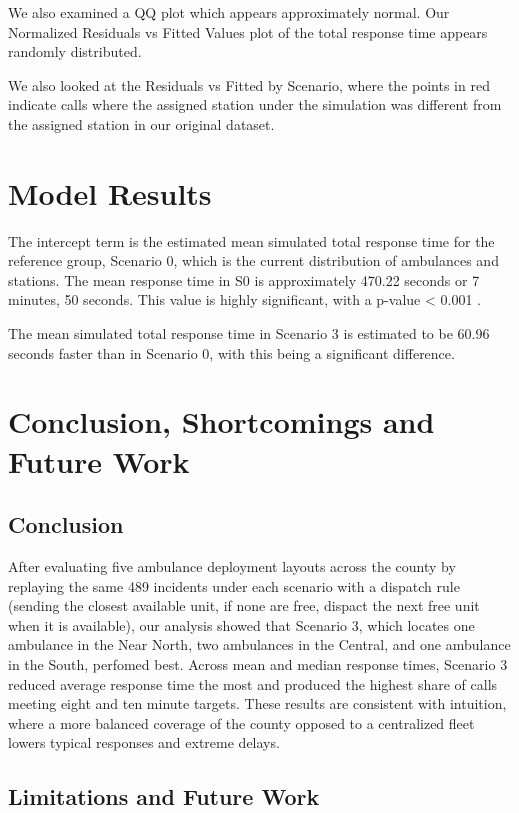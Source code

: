 \documentclass[
  11pt,
]{article}
\begin{document}
We also examined a QQ plot which appears approximately normal. Our
Normalized Residuals vs Fitted Values plot of the total response time
appears randomly distributed.

We also looked at the Residuals vs Fitted by Scenario, where the points
in red indicate calls where the assigned station under the simulation
was different from the assigned station in our original dataset.

\section{Model Results}\label{model-results}

The intercept term is the estimated mean simulated total response time
for the reference group, Scenario 0, which is the current distribution
of ambulances and stations. The mean response time in S0 is
approximately 470.22 seconds or 7 minutes, 50 seconds. This value is
highly significant, with a p-value \textless{} 0.001 .

The mean simulated total response time in Scenario 3 is estimated to be
60.96 seconds faster than in Scenario 0, with this being a significant
difference.

\section{Conclusion, Shortcomings and Future
Work}\label{conclusion-shortcomings-and-future-work}

\subsection{Conclusion}\label{conclusion}

After evaluating five ambulance deployment layouts across the county by
replaying the same 489 incidents under each scenario with a dispatch
rule (sending the closest available unit, if none are free, dispact the
next free unit when it is available), our analysis showed that Scenario
3, which locates one ambulance in the Near North, two ambulances in the
Central, and one ambulance in the South, perfomed best. Across mean and
median response times, Scenario 3 reduced average response time the most
and produced the highest share of calls meeting eight and ten minute
targets. These results are consistent with intuition, where a more
balanced coverage of the county opposed to a centralized fleet lowers
typical responses and extreme delays.

\subsection{Limitations and Future
Work}\label{limitations-and-future-work}
\end{document}
